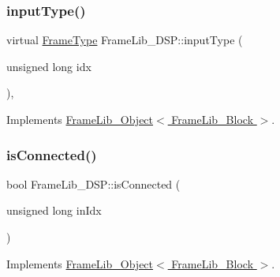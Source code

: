 \mbox{\label{class_frame_lib___d_s_p_abbd266dacec0eb86acaf584f737338b7}} 
\subsubsection{\texorpdfstring{input\+Type()}{inputType()}}
{\footnotesize\ttfamily virtual \hyperlink{_frame_lib___types_8h_ad495a9f61af7fff07d7e97979d1ab854}{Frame\+Type} Frame\+Lib\+\_\+\+D\+S\+P\+::input\+Type (\begin{DoxyParamCaption}\item[{unsigned long}]{idx }\end{DoxyParamCaption})\hspace{0.3cm}{\ttfamily [inline]}, {\ttfamily [virtual]}}



Implements \hyperlink{class_frame_lib___object_a6c5d94f1577471d33204078e86f51ff3}{Frame\+Lib\+\_\+\+Object$<$ Frame\+Lib\+\_\+\+Block $>$}.

\mbox{\label{class_frame_lib___d_s_p_a6c0e00484c67ea160cf87ec644807cac}} 
\subsubsection{\texorpdfstring{is\+Connected()}{isConnected()}}
{\footnotesize\ttfamily bool Frame\+Lib\+\_\+\+D\+S\+P\+::is\+Connected (\begin{DoxyParamCaption}\item[{unsigned long}]{in\+Idx }\end{DoxyParamCaption})\hspace{0.3cm}{\ttfamily [virtual]}}



Implements \hyperlink{class_frame_lib___object_a773123ebc7b3571e607cb1a6c4296d20}{Frame\+Lib\+\_\+\+Object$<$ Frame\+Lib\+\_\+\+Block $>$}.

\mbox{\label{class_frame_lib___d_s_p_acdcd85278b8cf1e80d50a7890d6975f9}} 
